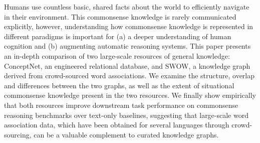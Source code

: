 Humans use countless basic, shared facts about the world to efficiently navigate in their environment. This commonsense knowledge is rarely communicated explicitly, however, understanding how commonsense knowledge is represented in different paradigms is important for (a) a deeper understanding of human cognition and (b) augmenting automatic reasoning systems. This paper presents an in-depth comparison of two large-scale resources of general knowledge: ConceptNet, an engineered relational database, and SWOW, a knowledge graph derived from crowd-sourced word associations. We examine the structure, overlap and differences between the two graphs, as well as the extent of situational commonsense knowledge present in the two resources. We finally show empirically that both resources improve downstream task performance on commonsense reasoning benchmarks over text-only baselines, suggesting that large-scale word association data, which have been obtained for several languages through crowd-sourcing, can be a valuable complement to curated knowledge graphs.
